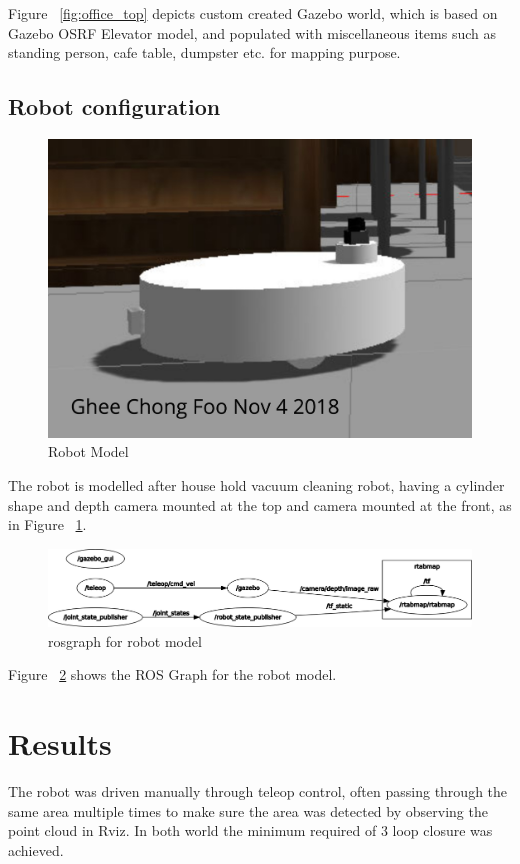 \documentclass[10pt,journal,compsoc]{IEEEtran}
\begin{document}
Figure ~\ref{fig:office_top} depicts custom created Gazebo world, which is based on Gazebo OSRF Elevator model, and populated with miscellaneous items such as standing person, cafe table, dumpster etc. for mapping purpose.

\subsection{Robot configuration}
\begin{figure}[thpb]
      \centering
      \includegraphics[width=\linewidth]{robot_model.png}
      \caption{Robot Model}
      \label{fig:robot_model}
\end{figure}

The robot is modelled after house hold vacuum cleaning robot, having a cylinder shape and depth camera mounted at the top and camera mounted at the front, as in Figure ~\ref{fig:robot_model}.  

\begin{figure}[thpb]
      \centering
      \includegraphics[width=\linewidth]{rosgraph.png}
      \caption{rosgraph for robot model}
      \label{fig:rosgraph}
\end{figure}

Figure ~\ref{fig:rosgraph} shows the ROS Graph for the robot model.

\section{Results}
The robot was driven manually through teleop control, often passing through the same area multiple times to make sure the area was detected by observing the point cloud in Rviz.  In both world the minimum required of 3 loop closure was achieved.
\end{document}
